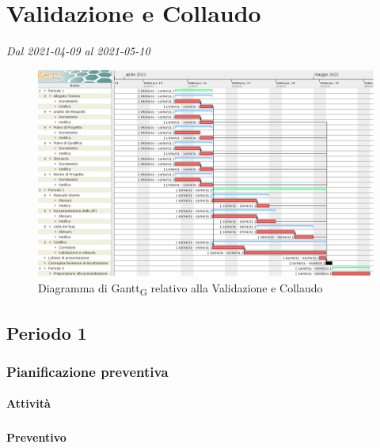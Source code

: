\section{Validazione e Collaudo}
\textit{Dal 2021-04-09 al 2021-05-10}


\begin{figure}[H]
	\centering
	\includegraphics[scale=0.45]{res/images/gantt_fase/06_gantt_validazione}
	\caption{Diagramma di Gantt\textsubscript{G} relativo alla Validazione e Collaudo}
\end{figure}


\subsection{Periodo 1}

\subsubsection{Pianificazione preventiva}

\paragraph{Attività}
\subparagraph*{}

\planningTable{
	
}

\paragraph{Preventivo}
\subparagraph*{}

